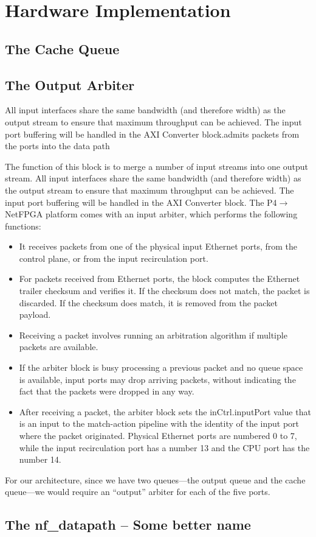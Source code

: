 \section{Hardware Implementation}
	\label{sec:cachequeue}
	\subsection{The Cache Queue}
	
	\subsection{The Output Arbiter}
	All input interfaces share the same bandwidth (and therefore width) as the output stream to ensure that maximum throughput can be achieved. The input port buffering will be handled in the AXI Converter block.admits packets from the ports into the data path
	
	The function of this block is to merge a number of input streams into one output stream. All input interfaces share the same bandwidth (and therefore width) as the output stream to ensure that maximum throughput can be achieved. The input port buffering will be handled in the AXI Converter block.
The P4$\rightarrow$NetFPGA platform comes with an input arbiter, which performs the following functions:
\begin{itemize}
	\item It receives packets from one of the physical input Ethernet ports, from the control plane, or from the input recirculation port.
	\item For packets received from Ethernet ports, the block computes the Ethernet trailer checksum and verifies it. If the checksum does not match, the packet is discarded. If the checksum does match, it is removed from the packet payload.
	\item Receiving a packet involves running an arbitration algorithm if multiple packets are available.
	\item If the arbiter block is busy processing a previous packet and no queue space is available, input ports may drop arriving packets, without indicating the fact that the packets were dropped in any way.
	\item After receiving a packet, the arbiter block sets the inCtrl.inputPort value that is an input to the match-action pipeline with the identity of the input port where the packet originated. Physical Ethernet ports are numbered 0 to 7, while the input recirculation port has a number 13 and the CPU port has the number 14. 
\end{itemize}
For our architecture, since we have two queues---the output queue and the cache queue---we would require an ``output'' arbiter for each of the five ports.

	\subsection{The nf\_datapath -- Some better name}


